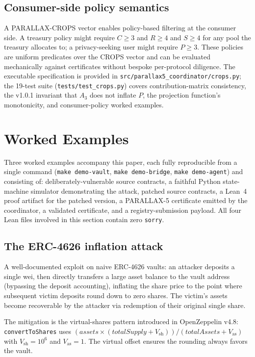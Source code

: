 \documentclass[11pt,a4paper]{article}
\begin{document}
\subsection{Consumer-side policy semantics}

A PARALLAX-CROPS vector enables policy-based filtering at the consumer side. A treasury policy might require $C \ge 3$ and $R \ge 4$ and $S \ge 4$ for any pool the treasury allocates to; a privacy-seeking user might require $P \ge 3$. These policies are uniform predicates over the CROPS vector and can be evaluated mechanically against certificates without bespoke per-protocol diligence. The executable specification is provided in \texttt{src/parallax5\_coordinator/crops.py}; the 19-test suite (\texttt{tests/test\_crops.py}) covers contribution-matrix consistency, the v1.0.1 invariant that $A_3$ does not inflate $P$, the projection function's monotonicity, and consumer-policy worked examples.

\section{Worked Examples}\label{sec:case-studies}

Three worked examples accompany this paper, each fully reproducible from a single command (\texttt{make demo-vault}, \texttt{make demo-bridge}, \texttt{make demo-agent}) and consisting of: deliberately-vulnerable source contracts, a faithful Python state-machine simulator demonstrating the attack, patched source contracts, a Lean~4 proof artifact for the patched version, a PARALLAX-5 certificate emitted by the coordinator, a validated certificate, and a registry-submission payload. All four Lean files involved in this section contain zero \texttt{sorry}.

\subsection{The ERC-4626 inflation attack}\label{ssec:demo-vault}

A well-documented exploit on naive ERC-4626 vaults: an attacker deposits a single wei, then directly transfers a large asset balance to the vault address (bypassing the deposit accounting), inflating the share price to the point where subsequent victim deposits round down to zero shares. The victim's assets become recoverable by the attacker via redemption of their original single share.

The mitigation is the virtual-shares pattern introduced in OpenZeppelin v4.8: \texttt{convertToShares} uses $(\mathit{assets} \times (\mathit{totalSupply} + V_{\mathrm{sh}})) / (\mathit{totalAssets} + V_{\mathrm{as}})$ with $V_{\mathrm{sh}} = 10^6$ and $V_{\mathrm{as}} = 1$. The virtual offset ensures the rounding always favors the vault.
\end{document}
